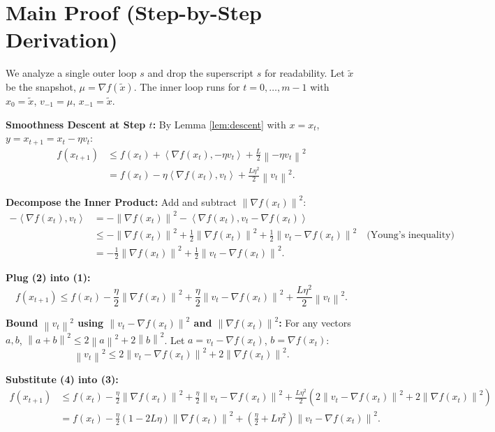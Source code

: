 \documentclass{article}
\newcommand{\norm}[1]{\left\| #1 \right\|}
\newcommand{\inner}[2]{\left\langle #1, #2 \right\rangle}
\newcommand{\grad}{\nabla}
\newcommand{\step}[1]{\text{\color{blue}[Step #1]}}
\begin{document}
\section*{Main Proof (Step-by-Step Derivation)}

We analyze a single outer loop $s$ and drop the superscript $s$ for readability. Let $\tilde{x}$ be the snapshot, $\mu = \grad f(\tilde{x})$. The inner loop runs for $t = 0, \dots, m-1$ with $x_0 = \tilde{x}$, $v_{-1} = \mu$, $x_{-1} = \tilde{x}$.

\step{1} \textbf{Smoothness Descent at Step $t$:}
By Lemma \ref{lem:descent} with $x = x_t$, $y = x_{t+1} = x_t - \eta v_t$:
\begin{align}
    f(x_{t+1}) &\le f(x_t) + \inner{\grad f(x_t)}{-\eta v_t} + \frac{L}{2} \norm{-\eta v_t}^2 \nonumber \\
    &= f(x_t) - \eta \inner{\grad f(x_t)}{v_t} + \frac{L \eta^2}{2} \norm{v_t}^2. \tag{1}
\end{align}

\step{2} \textbf{Decompose the Inner Product:}
Add and subtract $\norm{\grad f(x_t)}^2$:
\begin{align}
    -\inner{\grad f(x_t)}{v_t} &= -\norm{\grad f(x_t)}^2 - \inner{\grad f(x_t)}{v_t - \grad f(x_t)} \nonumber \\
    &\le -\norm{\grad f(x_t)}^2 + \frac{1}{2} \norm{\grad f(x_t)}^2 + \frac{1}{2} \norm{v_t - \grad f(x_t)}^2 \quad \text{(Young's inequality)} \nonumber \\
    &= -\frac{1}{2} \norm{\grad f(x_t)}^2 + \frac{1}{2} \norm{v_t - \grad f(x_t)}^2. \tag{2}
\end{align}

\step{3} \textbf{Plug (2) into (1):}
\begin{equation}
    f(x_{t+1}) \le f(x_t) - \frac{\eta}{2} \norm{\grad f(x_t)}^2 + \frac{\eta}{2} \norm{v_t - \grad f(x_t)}^2 + \frac{L \eta^2}{2} \norm{v_t}^2. \tag{3}
\end{equation}

\step{4} \textbf{Bound $\norm{v_t}^2$ using $\norm{v_t - \grad f(x_t)}^2$ and $\norm{\grad f(x_t)}^2$:}
For any vectors $a, b$, $\norm{a+b}^2 \le 2\norm{a}^2 + 2\norm{b}^2$. Let $a = v_t - \grad f(x_t)$, $b = \grad f(x_t)$:
\begin{equation}
    \norm{v_t}^2 \le 2 \norm{v_t - \grad f(x_t)}^2 + 2 \norm{\grad f(x_t)}^2. \tag{4}
\end{equation}

\step{5} \textbf{Substitute (4) into (3):}
\begin{align}
    f(x_{t+1}) &\le f(x_t) - \frac{\eta}{2} \norm{\grad f(x_t)}^2 + \frac{\eta}{2} \norm{v_t - \grad f(x_t)}^2 + \frac{L \eta^2}{2} \left( 2 \norm{v_t - \grad f(x_t)}^2 + 2 \norm{\grad f(x_t)}^2 \right) \nonumber \\
    &= f(x_t) - \frac{\eta}{2} (1 - 2 L \eta) \norm{\grad f(x_t)}^2 + \left( \frac{\eta}{2} + L \eta^2 \right) \norm{v_t - \grad f(x_t)}^2. \tag{5}
\end{align}
\end{document}
